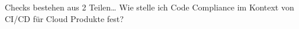 \documentclass[../main.tex]{subfiles}
\begin{document}
Checks bestehen aus 2 Teilen\dots
Wie stelle ich Code Compliance im Kontext von CI/CD für Cloud Produkte fest?
\end{document}
